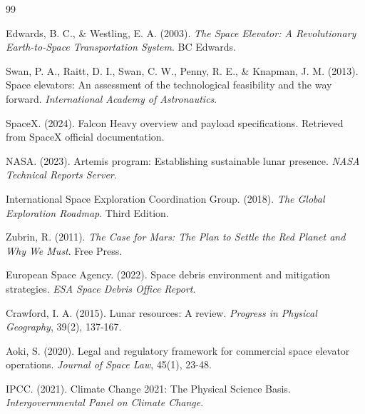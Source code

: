 \newpage
\begin{thebibliography}{99}

Edwards, B. C., \& Westling, E. A. (2003). \textit{The Space Elevator: A Revolutionary Earth-to-Space Transportation System}. BC Edwards.

Swan, P. A., Raitt, D. I., Swan, C. W., Penny, R. E., \& Knapman, J. M. (2013). Space elevators: An assessment of the technological feasibility and the way forward. \textit{International Academy of Astronautics}.

SpaceX. (2024). Falcon Heavy overview and payload specifications. Retrieved from SpaceX official documentation.

NASA. (2023). Artemis program: Establishing sustainable lunar presence. \textit{NASA Technical Reports Server}.

International Space Exploration Coordination Group. (2018). \textit{The Global Exploration Roadmap}. Third Edition.

Zubrin, R. (2011). \textit{The Case for Mars: The Plan to Settle the Red Planet and Why We Must}. Free Press.

European Space Agency. (2022). Space debris environment and mitigation strategies. \textit{ESA Space Debris Office Report}.

Crawford, I. A. (2015). Lunar resources: A review. \textit{Progress in Physical Geography}, 39(2), 137-167.

Aoki, S. (2020). Legal and regulatory framework for commercial space elevator operations. \textit{Journal of Space Law}, 45(1), 23-48.

IPCC. (2021). Climate Change 2021: The Physical Science Basis. \textit{Intergovernmental Panel on Climate Change}.

\end{thebibliography}
